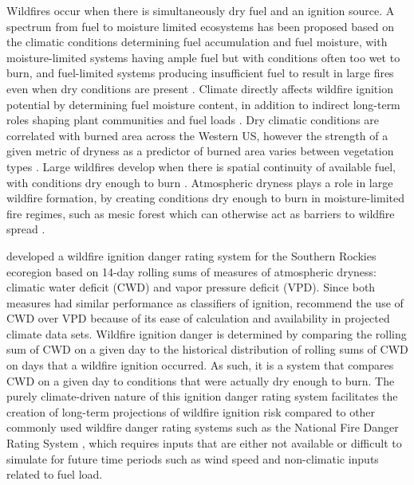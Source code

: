 \documentclass[11p]{article}
\begin{document}
Wildfires occur when there is simultaneously dry fuel and an ignition source. A spectrum from fuel to moisture limited ecosystems has been proposed based on the climatic conditions determining fuel accumulation and fuel moisture, with moisture-limited systems having ample fuel but with conditions often too wet to burn, and fuel-limited systems producing insufficient fuel to result in large fires even when dry conditions are present \citep{meynEnvironmentalDriversLarge2007}. Climate directly affects wildfire ignition potential by determining fuel moisture content, in addition to indirect long-term roles shaping plant communities and fuel loads \citep{littellReviewRelationshipsDrought2016}. Dry climatic conditions are correlated with burned area across the Western US, however the strength of a given metric of dryness as a predictor of burned area varies between vegetation types \citep{littellClimateWildfireArea2009}. Large wildfires develop when there is spatial continuity of available fuel, with conditions dry enough to burn %
\citep{millerConnectivityForestFuels2000}. Atmospheric dryness plays a role in large wildfire formation, by creating conditions dry enough to burn in moisture-limited fire regimes, such as mesic forest which can otherwise act as barriers to wildfire spread \citep{cawsonAtmosphericDrynessRemoves2024}.

\citet{thomaWaterBalanceIndicator2020} developed a wildfire ignition danger rating system for the Southern Rockies ecoregion \citep{omernikEcoregionsConterminousUnited1987} based on 14-day rolling sums of measures of atmospheric dryness: climatic water deficit (CWD) and vapor pressure deficit (VPD). Since both measures had similar performance as classifiers of ignition, \citet{thomaWaterBalanceIndicator2020} recommend the use of CWD over VPD because of its ease of calculation and availability in projected climate data sets.  Wildfire ignition danger is determined by comparing the rolling sum of CWD on a given day to the historical distribution of rolling sums of CWD on days that a wildfire ignition occurred. As such, it is a system that compares CWD on a given day to conditions that were actually dry enough to burn. The purely climate-driven nature of this ignition danger rating system facilitates the creation of long-term projections of wildfire ignition risk compared to other commonly used wildfire danger rating systems such as the National Fire Danger Rating System \citep{degrootChapter11Wildland2015}, which requires inputs that are either not available or difficult to simulate for future time periods such as wind speed and non-climatic inputs related to fuel load.
\end{document}
